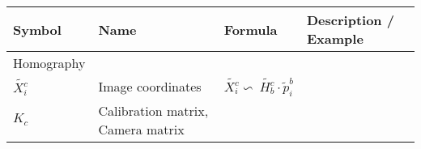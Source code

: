 \documentclass[
]{article}
\author{}
\date{}
\newcommand{\columnA}{0.06}
\newcommand{\columnB}{0.18}
\newcommand{\columnC}{0.33}
\newcommand{\columnD}{0.33}
\begin{document}
\renewcommand*{\arraystretch}{1.6}
\begin{longtable}[]{@{}llll@{}}
\toprule
\begin{minipage}[b]{\columnA\columnwidth}\raggedright
\textbf{Symbol}\strut
\end{minipage} & \begin{minipage}[b]{\columnB\columnwidth}\raggedright
\textbf{Name}\strut
\end{minipage} & \begin{minipage}[b]{\columnC\columnwidth}\raggedright
\textbf{Formula}\strut
\end{minipage} & \begin{minipage}[b]{\columnD\columnwidth}\raggedright
\textbf{Description / Example}\strut
\end{minipage}\tabularnewline
\midrule
\endhead
\begin{minipage}[t]{\columnA\columnwidth}\raggedright
Homography\strut
\end{minipage} & \begin{minipage}[t]{\columnB\columnwidth}\raggedright
\strut
\end{minipage} & \begin{minipage}[t]{\columnC\columnwidth}\raggedright
\strut
\end{minipage} & \begin{minipage}[t]{\columnD\columnwidth}\raggedright
\strut
\end{minipage}\hline\tabularnewline
\begin{minipage}[t]{\columnA\columnwidth}\raggedright
\(\tilde{X_i^c}\)\strut
\end{minipage} & \begin{minipage}[t]{\columnB\columnwidth}\raggedright
Image coordinates\strut
\end{minipage} & \begin{minipage}[t]{\columnC\columnwidth}\raggedright
\(\tilde{X_i^c} \backsim\ \tilde{H_b^c} \cdotp \tilde{p}_i^b\)\strut
\end{minipage} & \begin{minipage}[t]{\columnD\columnwidth}\raggedright
\strut
\end{minipage}\hline\tabularnewline
\begin{minipage}[t]{\columnA\columnwidth}\raggedright
\(K_c\)\strut
\end{minipage} & \begin{minipage}[t]{\columnB\columnwidth}\raggedright
Calibration matrix, Camera matrix\strut
\end{minipage} & \begin{minipage}[t]{\columnC\columnwidth}\raggedright

\end{minipage}
\end{longtable}
\end{document}
